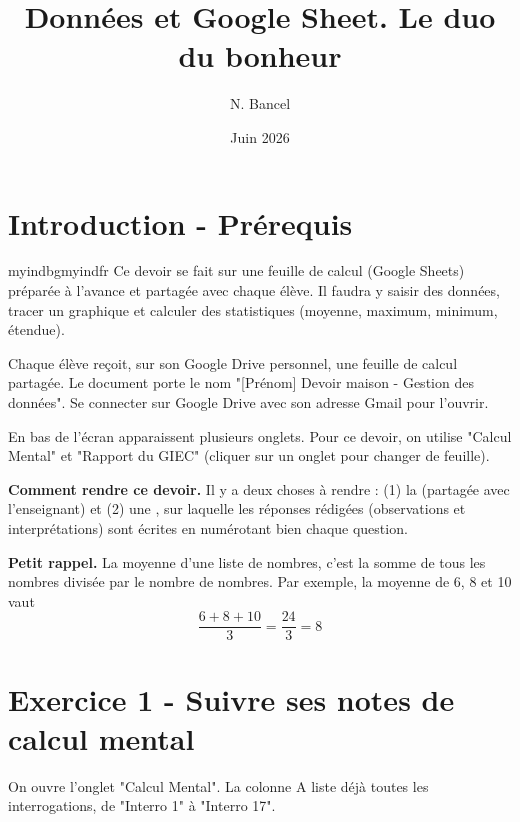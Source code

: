 \documentclass{exam}
\title{Données et Google Sheet. Le duo du bonheur}
\author{N. Bancel}
\date{Juin 2026}
\begin{document}
{\let\newpage\relax\maketitle}

\section{Introduction - Prérequis}

\begin{Indication}{myindbg}{myindfr}
  Ce devoir se fait sur une feuille de calcul (Google Sheets) préparée à l'avance et partagée avec chaque élève. Il faudra y saisir des données, tracer un graphique et calculer des statistiques (moyenne, maximum, minimum, étendue).
  \begin{compactitem}
    \item Chaque élève reçoit, sur son Google Drive personnel, une feuille de calcul partagée. Le document porte le nom "[Prénom] Devoir maison - Gestion des données". Se connecter sur Google Drive avec son adresse Gmail pour l'ouvrir. 
    \item En bas de l'écran apparaissent plusieurs onglets. Pour ce devoir, on utilise "Calcul Mental" et "Rapport du GIEC" (cliquer sur un onglet pour changer de feuille).
  \end{compactitem}
\par
\textbf{Comment rendre ce devoir.} Il y a deux choses à rendre : (1) la  (partagée avec l'enseignant) et (2) une , sur laquelle les réponses rédigées (observations et interprétations) sont écrites en numérotant bien chaque question. \\

\par
\textbf{Petit rappel.} La moyenne d'une liste de nombres, c'est la somme de tous les nombres divisée par le nombre de nombres. Par exemple, la moyenne de 6, 8 et 10 vaut 
  \[
  \frac{6 + 8 + 10}{3} = \frac{24}{3} = 8
  \]
\end{Indication}

\section{Exercice 1 - Suivre ses notes de calcul mental}

On ouvre l'onglet "Calcul Mental". La colonne A liste déjà toutes les interrogations, de "Interro 1" à "Interro 17".
\end{document}
